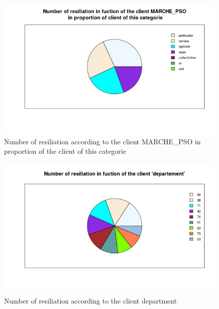 \documentclass[a4paper, 11pt]{article}
\begin{document}
        \begin{figure}[!ht]
        	\centering
                \includegraphics[height = 10 cm]{Valentin/Number_of_resiliation_in_fuction_of_the_client_MARCHE_PSO_proportion.png}
                \caption{Number of resiliation according to the client MARCHE\_PSO in proportion of the client of this categorie}
                \label{fig:resiliation_pso2}
        \end{figure}
        
        \begin{figure}[!ht]
        	\centering
                \includegraphics[height = 10 cm]{Valentin/Number_of_resiliation_in_fuction_of_the_client_departement.png}
                \caption{Number of resiliation according to the client department}
                \label{fig:resiliation_dep1}
        \end{figure}
        
\end{document}
